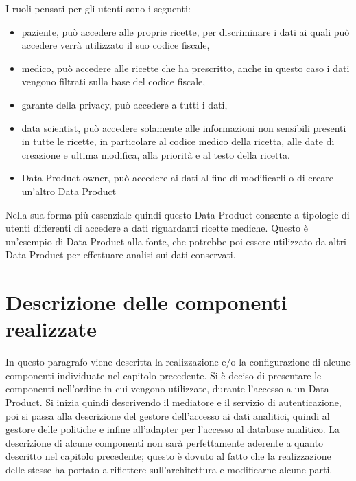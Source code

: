 \documentclass[12pt]{report}
\begin{document}
I ruoli pensati per gli utenti sono i seguenti:
\begin{itemize}
    \item paziente, può accedere alle proprie ricette, per discriminare i dati ai quali può accedere verrà utilizzato il suo codice fiscale,
    \item medico, può accedere alle ricette che ha prescritto, anche in questo caso i dati vengono filtrati sulla base del codice fiscale,
    \item garante della privacy, può accedere a tutti i dati,
    \item data scientist, può accedere solamente alle informazioni non sensibili presenti in tutte le ricette, in particolare al codice medico della ricetta, alle date  di creazione e ultima modifica, alla priorità e al testo della ricetta.  
    \item Data Product owner, può accedere ai dati al fine di modificarli o di creare un'altro Data Product
\end{itemize}
Nella sua forma più essenziale quindi questo Data Product consente a tipologie di utenti differenti di accedere a dati riguardanti ricette mediche.
Questo è un'esempio di Data Product alla fonte, che potrebbe poi essere utilizzato da altri Data Product per effettuare analisi sui dati conservati.

\section{Descrizione delle componenti realizzate}
In questo paragrafo viene descritta la realizzazione e/o la configurazione di alcune componenti individuate nel capitolo precedente.
Si è deciso di presentare le componenti nell'ordine in cui vengono utilizzate, durante l'accesso a un Data Product.
Si inizia quindi descrivendo il mediatore e il servizio di autenticazione, poi si passa alla descrizione del gestore dell'accesso ai dati analitici, quindi al gestore delle politiche e infine all'adapter per l'accesso al database analitico.
La descrizione di alcune componenti non sarà perfettamente aderente a quanto descritto nel capitolo precedente; questo è dovuto al fatto che la realizzazione delle stesse ha portato a riflettere sull'architettura e modificarne alcune parti.
\end{document}
